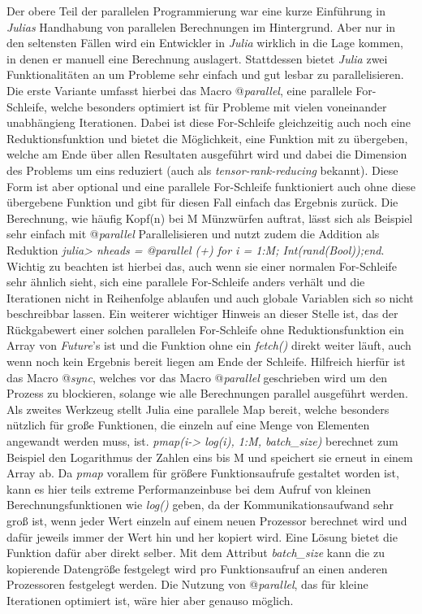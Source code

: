 \documentclass[proseminar,german,utf8]{zihpub}
\begin{document}
Der obere Teil der parallelen Programmierung war eine kurze Einführung in \textit{Julias} Handhabung von parallelen Berechnungen im Hintergrund. Aber nur in den seltensten Fällen wird ein Entwickler in \textit{Julia} wirklich in die Lage kommen, in denen er manuell eine Berechnung auslagert. Stattdessen bietet \textit{Julia} zwei Funktionalitäten an um Probleme sehr einfach und gut lesbar zu parallelisieren. Die erste Variante umfasst hierbei das Macro @\textit{parallel}, eine parallele For-Schleife, welche besonders optimiert ist für Probleme mit vielen voneinander unabhängieng Iterationen. Dabei ist diese For-Schleife gleichzeitig auch noch eine Reduktionsfunktion und bietet die Möglichkeit, eine Funktion mit zu übergeben, welche am Ende über allen Resultaten ausgeführt wird und dabei die Dimension des Problems um eins reduziert (auch als \textit{tensor-rank-reducing} bekannt). Diese Form ist aber optional und eine parallele For-Schleife funktioniert auch ohne diese übergebene Funktion und gibt für diesen Fall einfach das Ergebnis zurück. Die Berechnung, wie häufig Kopf(n) bei M Münzwürfen auftrat, lässt sich als Beispiel sehr einfach mit @\textit{parallel} Parallelisieren und nutzt zudem die Addition als Reduktion \textit{julia> nheads = @parallel (+) for i = 1:M; Int(rand(Bool));end}. Wichtig zu beachten ist hierbei das, auch wenn sie einer normalen For-Schleife sehr ähnlich sieht, sich eine parallele For-Schleife anders verhält und die Iterationen nicht in Reihenfolge ablaufen und auch globale Variablen sich so nicht beschreibbar lassen. Ein weiterer wichtiger Hinweis an dieser Stelle ist, das der Rückgabewert einer solchen parallelen For-Schleife ohne Reduktionsfunktion ein Array von \textit{Future}'s ist und die Funktion ohne ein \textit{fetch()} direkt weiter läuft, auch wenn noch kein Ergebnis bereit liegen am Ende der Schleife. Hilfreich hierfür ist das Macro @\textit{sync}, welches vor das Macro @\textit{parallel} geschrieben wird um den Prozess zu blockieren, solange wie alle Berechnungen parallel ausgeführt werden. Als zweites Werkzeug stellt Julia eine parallele Map bereit, welche besonders nützlich für große Funktionen, die einzeln auf eine Menge von Elementen angewandt werden muss, ist. \textit{pmap(i-> log(i), 1:M, batch\_size)} berechnet zum Beispiel den Logarithmus der Zahlen eins bis M und speichert sie erneut in einem Array ab. Da \textit{pmap} vorallem für größere Funktionsaufrufe gestaltet worden ist, kann es hier teils extreme Performanzeinbuse bei dem Aufruf von kleinen Berechnungsfunktionen wie\textit{ log()} geben, da der Kommunikationsaufwand sehr groß ist, wenn jeder Wert einzeln auf einem neuen Prozessor berechnet wird und dafür jeweils immer der Wert hin und her kopiert wird. Eine Lösung bietet die Funktion dafür aber direkt selber. Mit dem Attribut \textit{batch\_size} kann die zu kopierende Datengröße festgelegt wird pro Funktionsaufruf an einen anderen Prozessoren festgelegt werden. Die Nutzung von @\textit{parallel}, das für kleine Iterationen optimiert ist, wäre hier aber genauso möglich.
\end{document}

